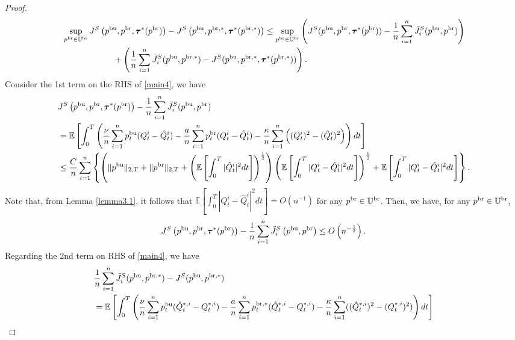 \documentclass[11pt]{article}
\numberwithin{equation}{section}
\begin{document}
\begin{proof}
{\small\begin{align}\label{main4}
&\sup_{p^{{\rm br}}\in\mathbb{U}^{\rm br}}J^S\left(p^{{\rm bu}},p^{{\rm br}}, \boldsymbol{\tau }^*(p^{{\rm br}})\right)-J^S\left(p^{{\rm bu}},p^{{\rm br},*}, \boldsymbol{\tau}^*(p^{{\rm br},*})\right)\leq \sup_{p^{{\rm br}}\in\mathbb{U}^{\rm br}}\left(J^S(p^{{\rm bu}},p^{{\rm br}}, \boldsymbol{\tau }^*(p^{{\rm br}}))-\frac{1}{n}\sum_{i=1}^n\tilde{J}_i^S(p^{{\rm bu}},p^{{\rm br}})\right)\nonumber \\
&\qquad\qquad\qquad +\left(\frac{1}{n}\sum_{i=1}^n\tilde{J}_i^S(p^{{\rm bu}},p^{{\rm br},*})-J^S(p^{{\rm bu}},p^{{\rm br},*}, \boldsymbol{\tau}^*(p^{{\rm br},*}))\right). 
\end{align}}Consider the 1st term on the RHS of \eqref{main4}, we have
{\small\begin{align*}
&J^S\left(p^{{\rm bu}},p^{{\rm br}}, \boldsymbol{\tau }^*(p^{{\rm br}})\right)-\frac{1}{n}\sum_{i=1}^n\tilde{J}_i^S(p^{{\rm bu}},p^{{\rm br}})\\
&=\mathbb{E}\left[\int_0^T\left(\frac{\nu}{n}\sum_{i=1}^np_t^{{\rm bu}}(Q_t^i-\hat{Q}_t^i)-\frac{a}{n}\sum_{i=1}^np_t^{{\rm br}}(Q_t^i-\hat{Q}_t^i)-\frac{\kappa}{n}\sum_{i=1}^n\left(( Q_t^i)^2-(\hat{Q}_t^i)^2\right)\right)dt\right]\\
&\leq \frac{C}{n}\sum_{i=1}^n\left\{\left(\Vert p^{{\rm bu}}\Vert_{2,T}+\Vert p^{{\rm br}}\Vert_{2,T}+\left( \mathbb{E}\left[\int_0^T|\hat{Q}_t^i|^2dt\right]\right)^{\frac{1}{2}}\right)\left( \mathbb{E}\left[\int_0^T|Q_t^i-\hat{Q}_t^i|^2dt\right]\right)^{\frac{1}{2}} +\mathbb{E}\left[\int_0^T|Q_t^i-\hat{Q}_t^i|^2dt\right]\right\}.
\end{align*}}
Note that, from Lemma \ref{lemma3.1}, it follows that $\mathbb{E}[\int_0^T|Q_t^i-\hat{Q}_t^i|^2dt]=O(n^{-1})$ for any $p^{{\rm br}}\in\mathbb{U}^{\rm br}$. Then, we have, for any $p^{{\rm br}}\in\mathbb{U}^{\rm br}$,
\begin{align}\label{eq:JtildeS10}
J^S\left(p^{{\rm bu}},p^{{\rm br}}, \boldsymbol{\tau }^*(p^{{\rm br}})\right)-\frac{1}{n}\sum_{i=1}^n\tilde{J}_i^S\left(p^{{\rm bu}},p^{{\rm br}}\right)\leq O\left(n^{-\frac{1}{2}}\right).
\end{align}
Regarding the 2nd term on RHS of \eqref{main4}, we have
\begin{align*}
&\frac{1}{n}\sum_{i=1}^n\tilde{J}_i^S(p^{{\rm bu}}, p^{{\rm br},*})-J^S(p^{{\rm bu}},p^{{\rm br},*})\\
&=\mathbb{E}\left[\int_0^T\left(\frac{\nu}{n}\sum_{i=1}^np_t^{{\rm bu}}(\hat{Q}_t^{*,i}-Q_t^{*,i})-\frac{a}{n}\sum_{i=1}^np_t^{{\rm br},*}(\hat{Q}_t^{*,i}-Q_t^{*,i})-\frac{\kappa}{n}\sum_{i=1}^n(( \hat{Q}_t^{*,i})^2-(Q_t^{*,i})^2)\right)dt\right]\\	

\end{align*}
\end{proof}
\end{document}
